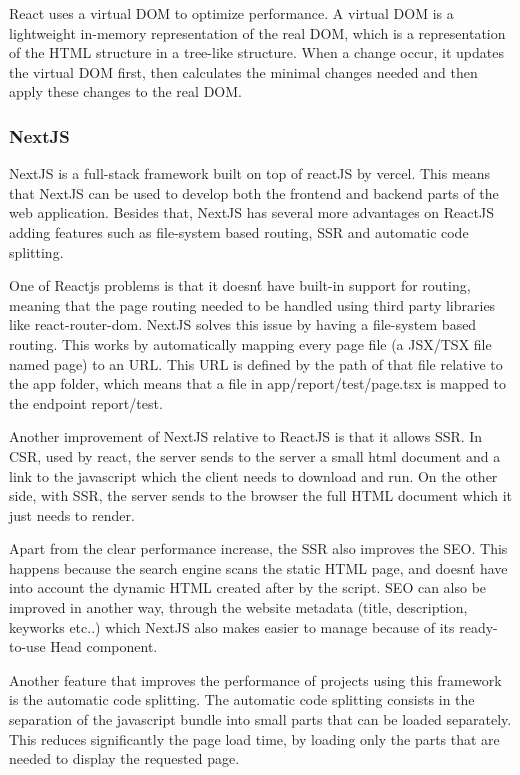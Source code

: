 React uses a virtual \gls{DOM} to optimize performance. A virtual
\gls{DOM} is a lightweight in-memory representation of the real \gls{DOM}, which is a
representation of the \gls{HTML} structure in a tree-like structure. When a change
occur, it updates the virtual \gls{DOM} first, then calculates the minimal changes needed
and then apply these changes to the real \gls{DOM}\cite{bawane2022review}.

\subsubsection{NextJS}
NextJS is a full-stack framework built on top of reactJS by vercel. This means
that NextJS can be used to develop both the frontend and backend parts of the
web application. Besides that, NextJS has several more advantages on ReactJS
adding features such as file-system based routing, \gls{SSR}
and automatic code splitting.

One of Reactjs problems is that it doesn\'t have built-in support for routing,
meaning that the page routing needed to be handled using third party libraries
like react-router-dom. NextJS solves this issue by having a file-system based
routing. This works by automatically mapping every page file (a \gls{JSX}/\gls{TSX}
file named page) to an \gls{URL}. This \gls{URL} is defined by the path of that file
relative to the app folder, which means that a file in app/report/test/page.tsx
is mapped to the endpoint report/test.

Another improvement of NextJS relative to ReactJS is that it allows \gls{SSR}. In
\gls{CSR}, used by react, the server sends to the server a small
html document and a link to the javascript which the client needs to download
and run. On the other side, with \gls{SSR}, the server sends to the browser the
full \gls{HTML} document which it just needs to render\cite{Salanke_A.R_G.S_Dalali_2022}.

Apart from the clear performance increase, the \gls{SSR} also improves the \gls{SEO}.
This happens because the search engine scans the static
\gls{HTML} page, and doesn\'t have into account the dynamic \gls{HTML} created after by
the script. \gls{SEO} can also be improved in another way, through the website
metadata (title, description, keyworks etc..) which NextJS also makes easier to
manage because of its ready-to-use Head component\cite{NextjsSSR}.

Another feature that improves the performance of projects using this framework
is the automatic code splitting. The automatic code splitting consists in
the separation of the javascript bundle into small parts that can be loaded
separately. This reduces significantly the page load time, by loading only the
parts that are needed to display the requested page\cite{Salanke_A.R_G.S_Dalali_2022}.


